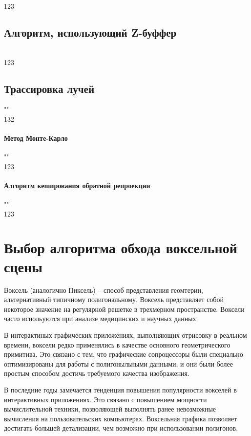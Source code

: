 123

\subsection{Алгоритм, использующий Z-буффер}\mbox{} \\
123~\cite{Rodzhers}

\subsection{Трассировка лучей}""\\
132~\cite{PBRT3e}

\paragraph{Метод Монте-Карло}""\\
123~\cite{PBRT3e}

\paragraph{Алгоритм кеширования обратной репроекции}""\\
123~\cite{ARTSwRPC}

\section{Выбор алгоритма обхода воксельной сцены}

Воксель (аналогично Пиксель) -- способ представления геомтерии, альтернативный типичному
полигональному. Воксель представляет собой некоторое значение на регулярной решетке в 
трехмерном пространстве. Воксели часто испольуются при анализе медицинских и научных
данных.

В интерактиных графических приложениях, выполняющих отрисовку в реальном времени, воксели 
редко применялись в качестве основного геометрического примитива. Это связано с тем, что
графические сопроцессоры были специально оптимизированы для работы с полигоныльными данными,
и они были более простым способом достичь требуемого качества изображения. 

В последние годы замечается тенденция повышения популярности вокселей в интерактивных приложениях.
Это связано с повышением мощности вычислительной техники, позволяющей выполнять ранее невозможные
вычисления на пользовательских компьютерах. Воксельная графика позволяет достигать большей детализации,
чем возможно при использовании полигонов. 

